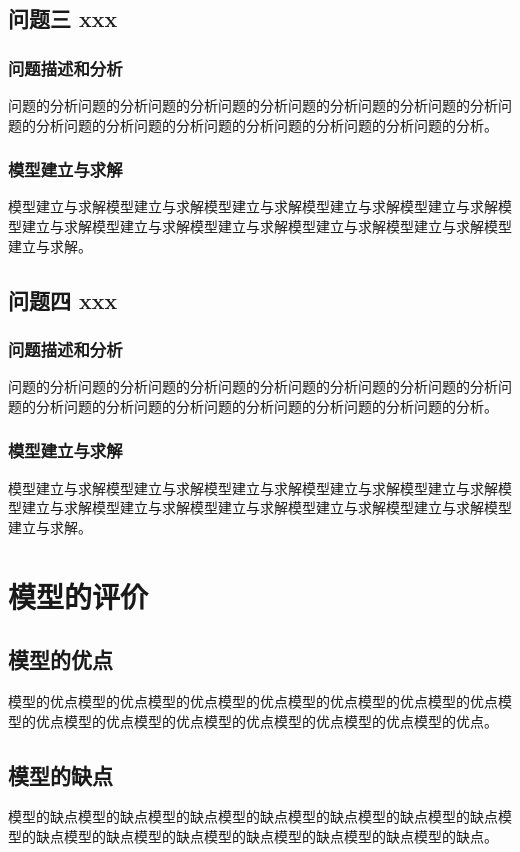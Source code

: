 \documentclass[bwprint]{gmcmthesis}
\numberwithin{figure}{section}
\begin{document}
\subsection{问题三 xxx}
\subsubsection{问题描述和分析}
问题的分析问题的分析问题的分析问题的分析问题的分析问题的分析问题的分析问题的分析问题的分析问题的分析问题的分析问题的分析问题的分析问题的分析。
\subsubsection{模型建立与求解}
模型建立与求解模型建立与求解模型建立与求解模型建立与求解模型建立与求解模型建立与求解模型建立与求解模型建立与求解模型建立与求解模型建立与求解模型建立与求解。

\subsection{问题四 xxx}
\subsubsection{问题描述和分析}
问题的分析问题的分析问题的分析问题的分析问题的分析问题的分析问题的分析问题的分析问题的分析问题的分析问题的分析问题的分析问题的分析问题的分析。
\subsubsection{模型建立与求解}
模型建立与求解模型建立与求解模型建立与求解模型建立与求解模型建立与求解模型建立与求解模型建立与求解模型建立与求解模型建立与求解模型建立与求解模型建立与求解。

\section{模型的评价}
\subsection{模型的优点}
模型的优点模型的优点模型的优点模型的优点模型的优点模型的优点模型的优点模型的优点模型的优点模型的优点模型的优点模型的优点模型的优点模型的优点。
\subsection{模型的缺点}
模型的缺点模型的缺点模型的缺点模型的缺点模型的缺点模型的缺点模型的缺点模型的缺点模型的缺点模型的缺点模型的缺点模型的缺点模型的缺点模型的缺点。
\end{document}
